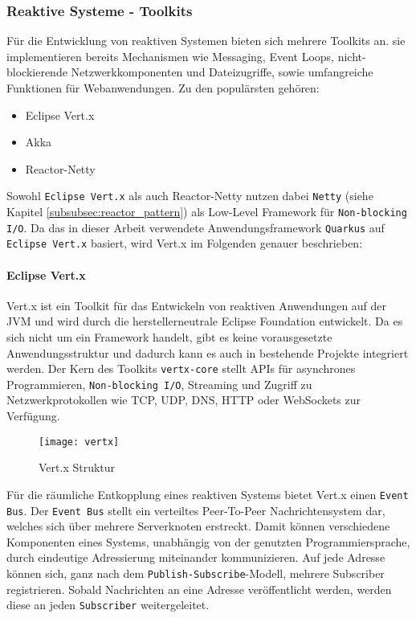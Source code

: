 \subsubsection{Reaktive Systeme - Toolkits}
\label{subsubsec:reaktive_systeme}
Für die Entwicklung von reaktiven Systemen bieten sich mehrere Toolkits an.
sie implementieren bereits Mechanismen wie Messaging, Event Loops,
nicht-blockierende Netzwerkkomponenten und Dateizugriffe, sowie umfangreiche Funktionen für Webanwendungen.
Zu den populärsten gehören:
\begin{itemize}
  \item Eclipse Vert.x \parencite{Vert.x}
  \item Akka \parencite{Akka}
  \item Reactor-Netty \parencite{ProjectReactor}
\end{itemize}
Sowohl \verb|Eclipse Vert.x| als auch Reactor-Netty nutzen dabei \verb|Netty|
(siehe Kapitel \ref{subsubsec:reactor_pattern}) als Low-Level Framework für \verb|Non-blocking I/O|.
Da das in dieser Arbeit verwendete Anwendungsframework \verb|Quarkus| auf \verb|Eclipse Vert.x| basiert, wird Vert.x im Folgenden genauer beschrieben:

\paragraph{Eclipse Vert.x}
Vert.x ist ein Toolkit für das Entwickeln von reaktiven Anwendungen auf der JVM und wird durch die herstellerneutrale Eclipse Foundation entwickelt.
Da es sich nicht um ein Framework handelt, gibt es keine vorausgesetzte Anwendungsstruktur und dadurch kann es auch in bestehende Projekte
integriert werden.
Der Kern des Toolkits \verb|vertx-core| stellt APIs für asynchrones Programmieren, \verb|Non-blocking I/O|, Streaming und Zugriff zu
Netzwerkprotokollen wie TCP, UDP, DNS, HTTP oder WebSockets zur Verfügung.
\begin{figure}[ht!]
  \centering
  \texttt{[image: vertx]}
  \caption{Vert.x Struktur \parencite{Ponge2020}}
  \label{fig:vertx}
\end{figure}
Für die räumliche Entkopplung eines reaktiven Systems bietet Vert.x einen \verb|Event Bus|.
Der \verb|Event Bus| stellt ein verteiltes Peer-To-Peer Nachrichtensystem dar, welches sich über mehrere Serverknoten erstreckt.
Damit können verschiedene Komponenten eines Systems, unabhängig von der genutzten Programmiersprache, durch eindeutige Adressierung miteinander kommunizieren.
Auf jede Adresse können sich, ganz nach dem \verb|Publish-Subscribe|-Modell, mehrere Subscriber registrieren. Sobald Nachrichten an eine
Adresse veröffentlicht werden, werden diese an jeden \verb|Subscriber| weitergeleitet.

